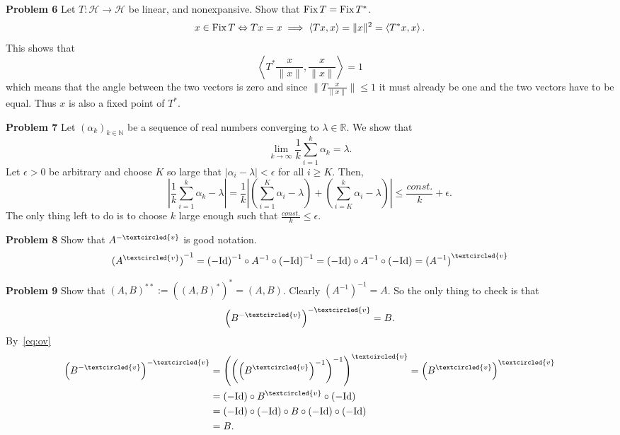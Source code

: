 \documentclass{scrartcl}
\newcommand{\N}{\mathbb{N}}
\newcommand{\R}{\mathbb{R}}
\renewcommand{\H}{\mathcal{H}}
\theoremstyle{plain}
\theoremstyle{remark}
\newcommand{\Id}{\textup{Id}}
\newcommand{\Fix}{\textup{Fix}\,}
\newcommand{\ov}{\textcircled{v}}
\begin{document}
\textbf{Problem 6} Let $T: \H \to \H$ be linear, and nonexpansive. Show that $\Fix T = \Fix T^*$.
\begin{equation}
  x \in \Fix T \Leftrightarrow Tx=x \implies \left\langle Tx, x \right\rangle = \lVert x \rVert^2 = \left\langle T^*x, x \right\rangle.
\end{equation}
This shows that 
\begin{equation}
  \left\langle T^*\frac{x}{\lVert x \rVert}, \frac{x}{\lVert x \rVert} \right\rangle = 1
\end{equation}
which means that the angle between the two vectors is zero and since $\lVert T \frac{x}{\lVert x \rVert} \rVert \le 1$ it must already be one and the two vectors have to be equal. Thus $x$ is also a fixed point of $T^*$.

\textbf{Problem 7} Let ${(\alpha_{k})}_{k \in \N}$ be a sequence of real numbers converging to $\lambda \in \R$. We show that
\begin{equation}
  \lim_{k \to \infty} \frac{1}{k} \sum_{i=1}^{k} \alpha_{k} = \lambda.
\end{equation}
Let $\epsilon>0$ be arbitrary and choose $K$ so large that $\lvert \alpha_{i} - \lambda \rvert < \epsilon$ for all $i\ge K$. Then,
\begin{equation}
  \left\lvert \frac{1}{k} \sum_{i=1}^{k} \alpha_{k} - \lambda \right\rvert = \frac{1}{k} \left\lvert \left(\sum_{i=1}^{K} \alpha_{i} - \lambda\right) + \left( \sum_{i=K}^{k} \alpha_{i} - \lambda \right) \right\rvert \le \frac{const.}{k} + \epsilon.
\end{equation}
The only thing left to do is to choose $k$ large enough such that $\frac{const.}{k} \le \epsilon$.

\textbf{Problem 8} Show that $A^{-\ov}$ is good notation.
\begin{equation}
  \label{eq:ov}
  {(A^{\ov})}^{-1} = {(-\Id)}^{-1} \circ A^{-1} \circ {(-\Id)}^{-1} = (-\Id) \circ A^{-1} \circ (-\Id) = {(A^{-1})}^{\ov}
\end{equation}

\textbf{Problem 9} Show that ${(A, B)}^{**} := {({(A, B)}^*)}^* = {(A, B)}$.
Clearly ${(A^{-1})}^{-1} = A$. So the only thing to check is that
\begin{equation}
  {\left(B^{-\ov}\right)}^{-\ov} = B.
\end{equation}
By~\eqref{eq:ov}
\begin{equation}
  \begin{aligned}
    {\left(B^{-\ov}\right)}^{-\ov} &= {\left({\left({\left(B^{\ov}\right)}^{-1}\right)}^{-1}\right)}^{\ov} = {\left(B^{\ov}\right)}^{\ov}\\
    &= {(-\Id)} \circ B^{\ov} \circ {(-\Id)} \\
    &= {(-\Id)} \circ {(-\Id)} \circ B \circ {(-\Id)} \circ {(-\Id)} \\
    &= B.
  \end{aligned}
\end{equation}
\end{document}
